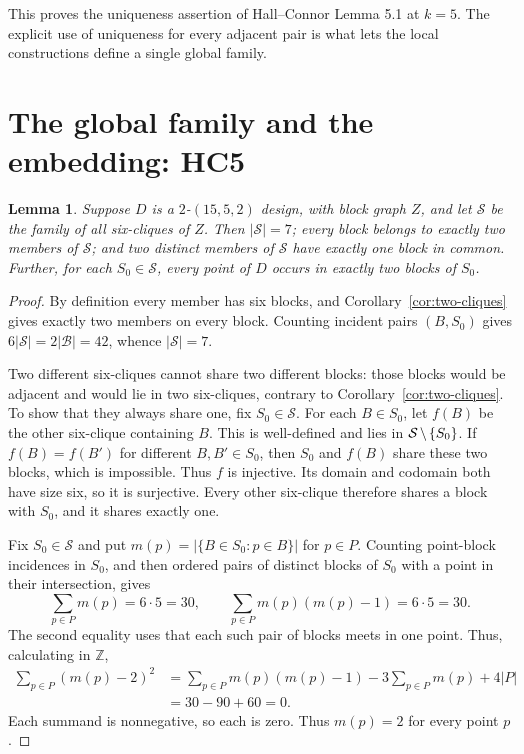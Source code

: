 \documentclass[11pt]{article}
\newcommand\cB{{\mathcal B}}
\newcommand\cS{{\mathcal S}}
\newcommand\ints{{\mathbb Z}}
\newcommand\diff{\mathbin{\mkern-1.5mu\setminus\mkern-1.5mu}}%
\newtheorem{lemma}[theorem]{Lemma}
\theoremstyle{definition}
\begin{document}
This proves the uniqueness assertion of Hall--Connor Lemma 5.1 at
$k=5$. The explicit use of uniqueness for every adjacent pair is what
lets the local constructions define a single global family.

\section{The global family and the embedding: HC5}

\begin{lemma}\label{lem:global}
Suppose $D$ is a $2$-$(15,5,2)$ design, with block graph $Z$, and let
$\cS$ be the family of all six-cliques of $Z$. Then $|\cS|=7$;
every block belongs to exactly two members of $\cS$; and two distinct
members of $\cS$ have exactly one block in common. Further, for each
$S_0\in\cS$, every point of $D$ occurs in exactly two blocks of $S_0$.
\end{lemma}
\begin{proof}
By definition every member has six blocks, and
Corollary~\ref{cor:two-cliques} gives exactly two members on every
block. Counting incident pairs $(B,S_0)$ gives
$6|\cS|=2|\cB|=42$, whence $|\cS|=7$.

Two different six-cliques cannot share two different blocks: those
blocks would be adjacent and would lie in two six-cliques, contrary to
Corollary~\ref{cor:two-cliques}. To show that they always share one,
fix $S_0\in\cS$. For each $B\in S_0$, let $f(B)$ be the other
six-clique containing $B$. This is well-defined and lies in
$\cS\diff\{S_0\}$. If $f(B)=f(B')$ for different $B,B'\in S_0$,
then $S_0$ and $f(B)$ share these two blocks, which is impossible.
Thus $f$ is injective. Its domain and codomain both have size six, so
it is surjective. Every other six-clique therefore shares a block
with $S_0$, and it shares exactly one.

Fix $S_0\in\cS$ and put
$m(p)=|\{B\in S_0:p\in B\}|$ for $p\in P$. Counting point-block
incidences in $S_0$, and then ordered pairs of distinct blocks of
$S_0$ with a point in their intersection, gives
\[
 \sum_{p\in P}m(p)=6\cdot5=30,\qquad
 \sum_{p\in P}m(p)(m(p)-1)=6\cdot5=30.
\]
The second equality uses that each such pair of blocks meets in one
point. Thus, calculating in $\ints$,
\[
\begin{aligned}
 \sum_{p\in P}(m(p)-2)^2
 &=\sum_{p\in P}m(p)(m(p)-1)-3\sum_{p\in P}m(p)+4|P|\\
 &=30-90+60=0.
\end{aligned}
\]
Each summand is nonnegative, so each is zero. Thus $m(p)=2$ for every
point $p$.
\end{proof}
\end{document}
